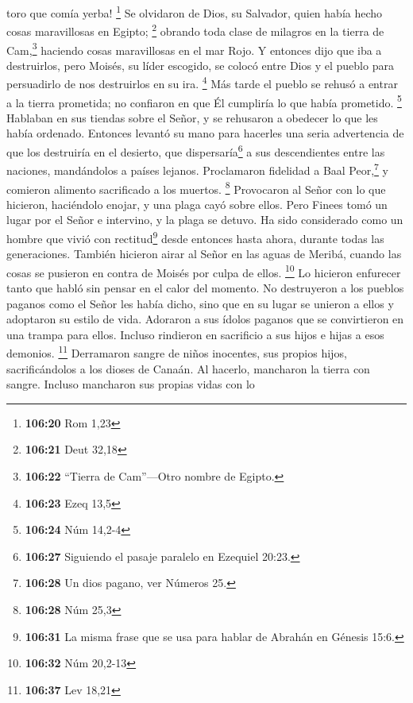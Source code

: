 toro que comía yerba! \footnote{\textbf{106:20} Rom 1,23}
 Se olvidaron de Dios, su Salvador, quien había hecho
cosas maravillosas en Egipto; \footnote{\textbf{106:21} Deut 32,18}
 obrando toda clase de milagros en la tierra de
Cam,\footnote{\textbf{106:22} ``Tierra de Cam''---Otro nombre de Egipto.}
haciendo cosas maravillosas en el mar Rojo.  Y entonces
dijo que iba a destruirlos, pero Moisés, su líder escogido, se colocó
entre Dios y el pueblo para persuadirlo de nos destruirlos en su ira.
\footnote{\textbf{106:23} Ezeq 13,5}  Más tarde el pueblo
se rehusó a entrar a la tierra prometida; no confiaron en que Él
cumpliría lo que había prometido. \footnote{\textbf{106:24} Núm 14,2-4}
 Hablaban en sus tiendas sobre el Señor, y se rehusaron a
obedecer lo que les había ordenado.  Entonces levantó su
mano para hacerles una seria advertencia de que los destruiría en el
desierto,  que dispersaría\footnote{\textbf{106:27}
  Siguiendo el pasaje paralelo en Ezequiel 20:23.} a sus descendientes
entre las naciones, mandándolos a países lejanos. 
Proclamaron fidelidad a Baal Peor,\footnote{\textbf{106:28} Un dios
  pagano, ver Números 25.} y comieron alimento sacrificado a los
muertos. \footnote{\textbf{106:28} Núm 25,3}  Provocaron
al Señor con lo que hicieron, haciéndolo enojar, y una plaga cayó sobre
ellos.  Pero Finees tomó un lugar por el Señor e
intervino, y la plaga se detuvo.  Ha sido considerado
como un hombre que vivió con rectitud\footnote{\textbf{106:31} La misma
  frase que se usa para hablar de Abrahán en Génesis 15:6.} desde
entonces hasta ahora, durante todas las generaciones. 
También hicieron airar al Señor en las aguas de Meribá, cuando las cosas
se pusieron en contra de Moisés por culpa de ellos. \footnote{\textbf{106:32}
  Núm 20,2-13}  Lo hicieron enfurecer tanto que habló sin
pensar en el calor del momento.  No destruyeron a los
pueblos paganos como el Señor les había dicho,  sino que
en su lugar se unieron a ellos y adoptaron su estilo de vida.
 Adoraron a sus ídolos paganos que se convirtieron en una
trampa para ellos.  Incluso rindieron en sacrificio a sus
hijos e hijas a esos demonios. \footnote{\textbf{106:37} Lev 18,21}
 Derramaron sangre de niños inocentes, sus propios hijos,
sacrificándolos a los dioses de Canaán. Al hacerlo, mancharon la tierra
con sangre.  Incluso mancharon sus propias vidas con lo
